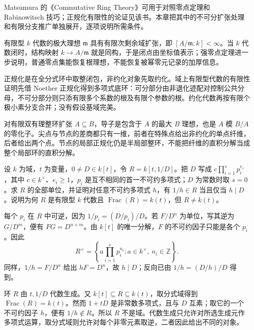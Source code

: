 \ProseParagraphBreak
Matsumura 的《Commutative Ring Theory》\cite[§5, Theorems 5.3--5.4, pp. 33--34]{Matsumura1989CommutativeRingTheory}可用于对照零点定理和 Rabinowitsch 技巧；正规化有限性的论证见该书\cite[§33, Integral closure of a Noetherian integral domain, pp. 261--263]{Matsumura1989CommutativeRingTheory}。本章把其中的不可分扩张处理和有限分支推广单独展开，逐项说明所需条件。








\begin{chaptersummary}
	有限型 \(k\) 代数的极大理想 \(\mathfrak m\) 具有有限次剩余域扩张，即 \([A/\mathfrak m:k]<\infty\)。当 \(k\) 代数闭时，结构映射 \(k\to A/\mathfrak m\) 就是同构，于是闭点由坐标值表示；强零点定理进一步说明，普通零点集能恢复根理想，不能恢复被幂零元记录的加厚信息。

	\ProseParagraphBreak
	正规化是在全分式环中取整闭包，非约化对象先取约化。域上有限型代数的有限性证明先借 Noether 正规化得到多项式底环：可分部分由非退化迹配对控制公共分母，不可分部分则只添有限多个系数的根及有限个参数的根。约化代数再按有限个极小素分支合并；没有假设基域完美。

	\ProseParagraphBreak
	对有限双有理整环扩张 \(A\subseteq B\)，导子是包含于 \(A\) 的最大 \(B\) 理想，也是 \(A\) 模 \(B/A\) 的零化子。尖点与节点的差商都只有一维，前者在特殊点给出非约化的单点纤维，后者给出两个点。节点的局部正规化仍是半局部整环，不能把纤维的直积分解当成整个局部环的直积分解。
\end{chaptersummary}

\BookExercises

\begin{exercise}\label{b3:ex:06-rational-field-algebra}
	设 \(k\) 为域，\(t\) 为变量，\(0\ne D\in k[t]\)，令 \(R=k[t,1/D]\)。把 \(D\) 写成 \(c\prod_{i=1}^s p_i^{e_i}\)，其中 \(c\in k^\times\)、\(e_i\ge1\)，\(p_i\) 是互不相同的首一不可约多项式；\(D\) 为常数时取 \(s=0\)。求 \(R\) 的全部单位，并证明对任意不可约多项式 \(h\)，有 \(1/h\in R\) 当且仅当 \(h\mid D\)。说明为何 \(R\) 是有限型 \(k\) 代数且 \(\operatorname{Frac}(R)=k(t)\)，但 \(R\ne k(t)\)。
\end{exercise}
\begin{solution}
	每个 \(p_i\) 在 \(R\) 中可逆，因为 \(1/p_i=(D/p_i)/D\)。若 \(F/D^n\) 为单位，写其逆为 \(G/D^m\)，便有 \(FG=D^{n+m}\)。由 \(k[t]\) 的唯一分解，\(F\) 的不可约因子只能是各个 \(p_i\)。因此
	\[
		R^\times=\left\{a\prod_{i=1}^s p_i^{n_i}:a\in k^\times,\ n_i\in\mathbb Z\right\}.
	\]
	同样，\(1/h=F/D^n\) 给出 \(hF=D^n\)，故 \(h\mid D\)；反向已由 \(1/h=(D/h)/D\) 得到。

	环 \(R\) 由 \(t,1/D\) 代数生成。又 \(k[t]\subseteq R\subseteq k(t)\)，取分式域得到 \(\operatorname{Frac}(R)=k(t)\)。然而 \(1+tD\) 是非常数多项式，且与 \(D\) 互素；取它的一个不可约因子 \(h\)，便有 \(1/h\notin R\)。所以 \(R\) 不是域。代数生成只允许对所选生成元作多项式运算，取分式域则允许对每个非零元素取逆，二者因此给出不同的对象。
\end{solution}

